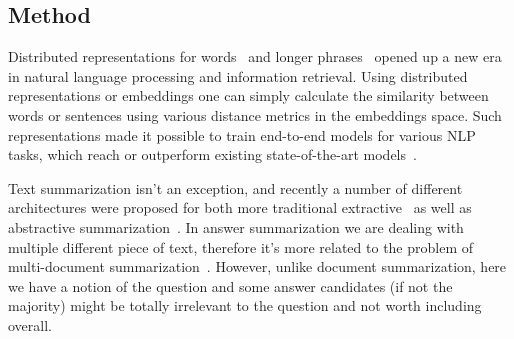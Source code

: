 \subsection{Method}
\label{section:non-factoid:proposal:method}

Distributed representations for words~\cite{mikolov2013distributed,pennington2014glove} and longer phrases~\cite{le2014distributed,kiros2015skip} opened up a new era in natural language processing and information retrieval.
Using distributed representations or embeddings one can simply calculate the similarity between words or sentences using various distance metrics in the embeddings space.
Such representations made it possible to train end-to-end models for various NLP tasks, which reach or outperform existing state-of-the-art models~\cite{collobert2011natural}.

Text summarization isn't an exception, and recently a number of different architectures were proposed for both more traditional extractive~\cite{kaageback2014extractive} as well as abstractive summarization~\cite{rush-chopra-weston:2015:EMNLP,chopraabstractive16}.
In answer summarization we are dealing with multiple different piece of text, therefore it's more related to the problem of multi-document summarization~\cite{cao2015ranking}.
However, unlike document summarization, here we have a notion of the question and some answer candidates (if not the majority) might be totally irrelevant to the question and not worth including overall.

